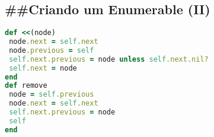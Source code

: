 \documentclass[serif,mathserif]{article}
\begin{document}
\subsection{\#\#Criando um Enumerable (II)}


\begin{lstlisting}[language=ruby]
def <<(node)
 node.next = self.next
 node.previous = self
 self.next.previous = node unless self.next.nil?
 self.next = node
end
def remove
 node = self.previous
 node.next = self.next
 self.next.previous = node
 self
end
\end{lstlisting}
\end{document}
